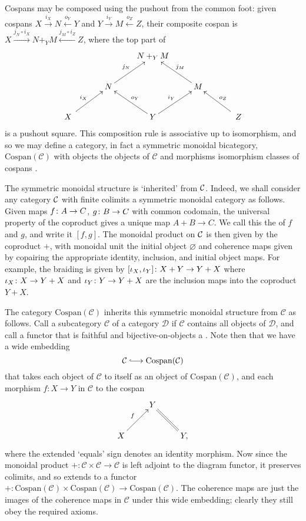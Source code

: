 Cospans may be composed using the pushout from the common
foot: given cospans $X \stackrel{i_X}{\longrightarrow} N
\stackrel{o_Y}{\longleftarrow} Y$ and $Y \stackrel{i_Y}{\longrightarrow} M
\stackrel{o_Z}{\longleftarrow} Z$, their composite cospan is $X \stackrel{j_N
\circ i_X}{\longrightarrow} N+_YM \stackrel{j_M\circ i_Z}{\longleftarrow} Z$,
where the top part of
\[
  \xymatrix{
    && N+_YM \\
    & N \ar[ur]^{j_N} && M \ar[ul]_{j_M} \\
    \quad X \quad \ar[ur]^{i_X} && Y \ar[ul]_{o_Y} \ar[ur]^{i_Y} && \quad Z \quad \ar[ul]_{o_Z}
  }
\]
is a pushout square. This composition rule is associative up to isomorphism, and
so we may define a category, in fact a symmetric monoidal bicategory,
$\mathrm{Cospan}(\mathcal C)$ with objects the objects of $\mathcal C$ and
morphisms isomorphism classes of cospans \cite{Ben}.

The symmetric monoidal structure is `inherited' from $\mathcal C$. Indeed, we shall
consider any category $\mathcal C$ with finite colimits a symmetric monoidal category
as follows. Given maps $f {\colon} A \to C$, $g {\colon} B \to C$ with common
codomain, the universal property of the coproduct gives a unique map $A+B \to
C$. We call this the  of $f$ and $g$, and write it $[f,g]$. The
monoidal product on $\mathcal C$ is then given by the coproduct $+$, with monoidal
unit the initial object $\varnothing$ and coherence maps given by copairing the
appropriate identity, inclusion, and initial object maps. For example, the
braiding is given by $[\iota_X,\iota_Y]{\colon} X+Y \to Y+X$ where $\iota_X{\colon} X
\to Y+X$ and $\iota_Y{\colon} Y \to Y+X$ are the inclusion maps into the coproduct
$Y+X$.

The category $\mathrm{Cospan(\mathcal C)}$ inherits this symmetric monoidal
structure from $\mathcal C$ as follows. Call a subcategory $\mathcal C$ of a
category $\mathcal D$  if $\mathcal C$ contains all objects of
$\mathcal D$, and call a functor that is faithful and bijective-on-objects a
.  Note then that we have a wide embedding
\[
  \mathcal C \hooklongrightarrow \mathrm{Cospan(\mathcal C)}
\]
that takes each object of $\mathcal C$ to itself as an object of
$\mathrm{Cospan(\mathcal C)}$, and each morphism $f\colon  X \to Y$ in $\mathcal
C$ to the cospan
\[
  \xymatrix{
    & Y \\
    X \ar[ur]^{f} && Y, \ar@{=}[ul]
  }
\]
where the extended `equals' sign denotes an identity morphism. Now since the
monoidal product $+\colon \mathcal C \times \mathcal C \to \mathcal C$ is left
adjoint to the diagram functor, it preserves colimits, and so extends to a
functor $+\colon \mathrm{Cospan(\mathcal C)} \times \mathrm{Cospan(\mathcal C)}
\to \mathrm{Cospan(\mathcal C)}$. The coherence maps are just the images of the
coherence maps in $\mathcal C$ under this wide embedding; clearly they still
obey the required axioms.

